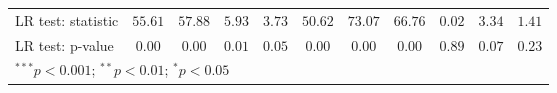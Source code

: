 \begin{table}
\begin{center}
\begin{tabular}{l c c c c c c c c c c}
LR test: statistic                & $55.61$       & $57.88$       & $5.93$        & $3.73$        & $50.62$        & $73.07$       & $66.76$       & $0.02$        & $3.34$        & $1.41$        \\
LR test: p-value                  & $0.00$        & $0.00$        & $0.01$        & $0.05$        & $0.00$         & $0.00$        & $0.00$        & $0.89$        & $0.07$        & $0.23$        \\
\hline
\multicolumn{11}{l}{\scriptsize{$^{***}p<0.001$; $^{**}p<0.01$; $^{*}p<0.05$}}
\end{tabular}
\label{Tab:SCSAR_Estimates_G3_Phi025}
\end{center}
\end{table}
